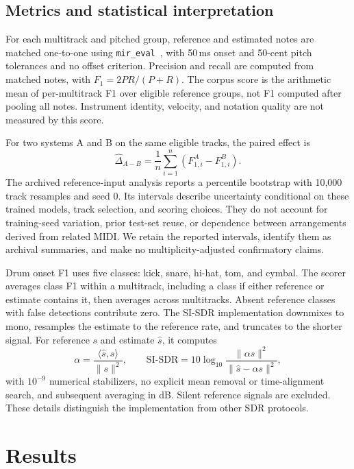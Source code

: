 \documentclass[11pt]{article}
\begin{document}
\subsection{Metrics and statistical interpretation}
For each multitrack and pitched group, reference and estimated notes are matched
one-to-one using \texttt{mir\_eval}~\citep{raffel2014mireval}, with 50\,ms onset
and 50-cent pitch tolerances and no offset criterion. Precision and recall are
computed from matched notes, with $F_1=2PR/(P+R)$. The corpus score is the arithmetic
mean of per-multitrack F1 over eligible reference groups, not F1 computed after
pooling all notes. Instrument identity, velocity, and notation quality are not
measured by this score.

For two systems A and B on the same eligible tracks, the paired effect is
\begin{equation}
 \widehat\Delta_{A-B}=\frac{1}{n}\sum_{i=1}^{n}(F_{1,i}^{A}-F_{1,i}^{B}).
\end{equation}
The archived reference-input analysis reports a percentile bootstrap with 10,000
track resamples and seed 0. Its intervals describe uncertainty conditional on these
trained models, track selection, and scoring choices. They do not account for
training-seed variation, prior test-set reuse, or dependence between arrangements
derived from related MIDI. We retain the reported intervals, identify them as
archival summaries, and make no multiplicity-adjusted confirmatory claims.

Drum onset F1 uses five classes: kick, snare, hi-hat, tom, and cymbal. The scorer
averages class F1 within a multitrack, including a class if either reference or
estimate contains it, then averages across multitracks. Absent reference classes
with false detections contribute zero. The SI-SDR implementation downmixes to mono,
resamples the estimate to the reference rate, and truncates to the shorter signal.
For reference $s$ and estimate $\hat s$, it computes
\begin{equation}
 \alpha=\frac{\langle\hat s,s\rangle}{\|s\|^2},\qquad
 \mathrm{SI\text{-}SDR}=10\log_{10}
 \frac{\|\alpha s\|^2}{\|\hat s-\alpha s\|^2},
\end{equation}
with $10^{-9}$ numerical stabilizers, no explicit mean removal or time-alignment
search, and subsequent averaging in dB. Silent reference signals are excluded.
These details distinguish the implementation from other SDR protocols.

\section{Results}
\end{document}
